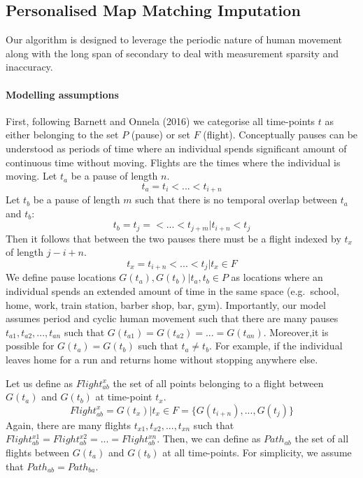 \documentclass[man]{apa6}
\theoremstyle{definition}
\theoremstyle{definition}
\theoremstyle{definition}
\theoremstyle{remark}
\begin{document}
\subsection{Personalised Map Matching
Imputation}\label{personalised-map-matching-imputation}

Our algorithm is designed to leverage the periodic nature of human
movement along with the long span of secondary to deal with measurement
sparsity and inaccuracy.

\paragraph{Modelling assumptions}\label{modelling-assumptions}

First, following Barnett and Onnela (2016) we categorise all time-points
\(t\) as either belonging to the set \(P\) (pause) or set \(F\)
(flight). Conceptually pauses can be understood as periods of time where
an individual spends significant amount of continuous time without
moving. Flights are the times where the individual is moving. Let
\(t_a\) be a pause of length \(n\). \[t_a = t_i < ... < t_{i+n}\] Let
\(t_b\) be a pause of length \(m\) such that there is no temporal
overlap between \(t_a\) and \(t_b\):
\[t_b = t_j= < ... < t_{j+m}|t_{i+n}< t_j\] Then it follows that between
the two pauses there must be a flight indexed by \(t_x\) of length
\(j-i+n\). \[t_x =  t_{i+n} < ... < t_{j} |t_x \in F\] We define pause
locations \(G(t_a), G(t_b) | t_a, t_b \in P\) as locations where an
individual spends an extended amount of time in the same space
(e.g.~school, home, work, train station, barber shop, bar, gym).
Importantly, our model assumes period and cyclic human movement such
that there are many pauses \(t_{a1},t_{a2},...,t_{an}\) such that
\(G(t_{a1}) = G(t_{a2}) = ... = G(t_{an})\). Moreover,it is possible for
\(G(t_a) = G(t_b)\) such that \(t_a \ne t_b\). For example, if the
individual leaves home for a run and returns home without stopping
anywhere else.

Let us define as \(Flight^x_{ab}\) the set of all points belonging to a
flight between \(G(t_a)\) and \(G(t_b)\) at time-point \(t_x\).
\[Flight^x_{ab}= G(t_x)|t_x \in F =  \{G(t_{i+n}),...,G(t_j)\}\] Again,
there are many flights \(t_{x1},t_{x2},...,t_{xn}\) such that
\(Flight^{x1}_{ab} = Flight^{x2}_{ab} = ... = Flight^{xn}_{ab}\). Then,
we can define as \(Path_{ab}\) the set of all flights between \(G(t_a)\)
and \(G(t_b)\) at all time-points. For simplicity, we assume that
\(Path_{ab}=Path_{ba}\).
\end{document}
